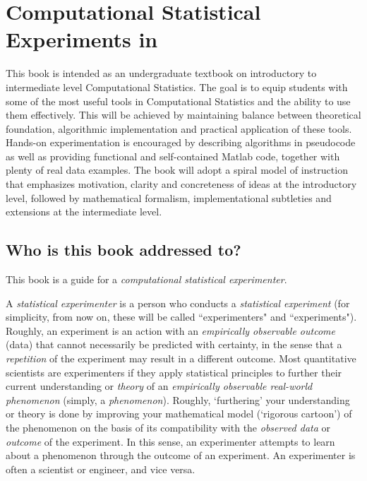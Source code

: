 \section*{Computational Statistical Experiments in \Matlab}\label{S:CompStatExps}

This book is intended as an undergraduate textbook on introductory to intermediate level Computational Statistics. The goal is to equip students with some of the most useful tools in Computational Statistics and the ability to use them effectively. This will be achieved by maintaining balance between theoretical foundation, algorithmic implementation and practical application of these tools. Hands-on experimentation is encouraged by describing algorithms in pseudocode as well as providing functional and self-contained Matlab code, together with plenty of real data examples. The book will adopt a spiral model of instruction that emphasizes motivation, clarity and concreteness of ideas at the introductory level, followed by mathematical formalism, implementational subtleties and extensions at the intermediate level.

\subsection*{Who is this book addressed to?}
This book is a guide for a {\it computational statistical experimenter}.

A {\it statistical experimenter} is a person who conducts a {\it statistical experiment} (for simplicity, from now on, these will be called ``experimenters" and ``experiments").  Roughly, an experiment is an action with an {\it empirically observable outcome} (data) that cannot necessarily be predicted with certainty, in the sense that a {\it repetition} of the experiment may result in a different outcome.  Most quantitative scientists are experimenters if they apply statistical principles to further their current understanding or {\it theory} of an {\it empirically observable real-world phenomenon} (simply, a {\it phenomenon}).  Roughly, `furthering' your understanding or theory is done by improving your mathematical model (\lq rigorous cartoon\rq) of the phenomenon on the basis of its compatibility with the {\it observed data} or {\it outcome} of the experiment.  In this sense, an experimenter attempts to learn about a phenomenon through the outcome of an experiment.  An experimenter is often a scientist or engineer, and vice versa.

